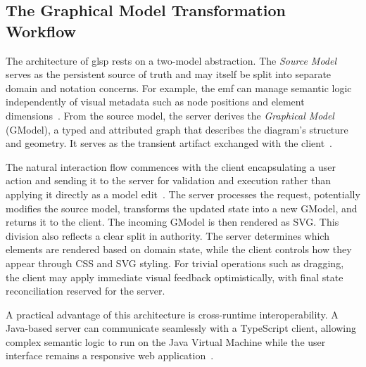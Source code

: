 \subsection{The Graphical Model Transformation Workflow}
\label{subsec:bg_glsp_transformation}

The architecture of \gls{glsp} rests on a two-model abstraction.
The \textit{Source Model} serves as the persistent source of truth and may itself be split into separate domain and notation concerns.
For example, the \gls{emf} can manage semantic logic independently of visual metadata such as node positions and element dimensions~\cite{metin_developing_2023}.
From the source model, the server derives the \textit{Graphical Model} (GModel), a typed and attributed graph that describes the diagram's structure and geometry.
It serves as the transient artifact exchanged with the client~\cite{bork_vision_2024}.

The natural interaction flow commences with the client encapsulating a user action and sending it to the server for validation and execution rather than applying it directly as a model edit~\cite{bork_vision_2024}.
The server processes the request, potentially modifies the source model, transforms the updated state into a new GModel, and returns it to the client.
The incoming GModel is then rendered as SVG.
This division also reflects a clear split in authority.
The server determines which elements are rendered based on domain state, while the client controls how they appear through CSS and SVG styling.
For trivial operations such as dragging, the client may apply immediate visual feedback optimistically, with final state reconciliation reserved for the server.

A practical advantage of this architecture is cross-runtime interoperability.
A Java-based server can communicate seamlessly with a TypeScript client, allowing complex semantic logic to run on the Java Virtual Machine while the user interface remains a responsive web application~\cite{metin_developing_2023, noauthor_eclipse-glspglsp-examples_2026}.